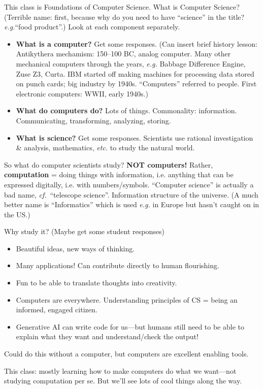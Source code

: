 \documentclass{article}
\newcommand{\etc}{\emph{etc.}\xspace}
\newcommand{\eg}{\emph{e.g.}\xspace}
\begin{document}
This class is Foundations of Computer Science.  What is Computer
Science?  (Terrible name: first, because why do you need to have
``science'' in the title?  \eg ``food product''.)  Look at each
component separately.
\begin{itemize}
\item \textbf{What is a computer?}  Get some responses.  (Can insert
  brief history lesson: Antikythera mechamism: 150--100 BC, analog
  computer.  Many other mechanical computers through the years,
  \eg Babbage Difference Engine, Zuse Z3, Curta.  IBM started off
  making machines for processing data stored on punch cards; big
  industry by 1940s. ``Computers'' referred to people.  First
  electronic computers: WWII, early 1940s.)
\item \textbf{What do computers do?}  Lots of things.  Commonality:
  information.  Communicating, transforming, analyzing, storing.
\item \textbf{What is science?}  Get some responses.  Scientists use
  rational investigation \& analysis, mathematics, \etc to study the
  natural world.
\end{itemize}

So what do computer scientists study?  \textbf{NOT computers!}
Rather, \textbf{computation} = doing things with information,
i.e. anything that can be expressed digitally, i.e. with
numbers/symbols.  ``Computer science'' is actually a bad name,
\emph{cf.}\ ``telescope science''.  Information structure of the
universe. (A much better name is ``Informatics'' which is used \eg in
Europe but hasn't caught on in the US.)

Why study it?  (Maybe get some student responses)
\begin{itemize}
\item Beautiful ideas, new ways of thinking.
\item Many applications!  Can contribute directly to human
  flourishing.
\item Fun to be able to translate thoughts into creativity.
\item Computers are everywhere.  Understanding principles of CS =
  being an informed, engaged citizen.
\item Generative AI can write code for us---but humans still need to
  be able to explain what they want and understand/check the output!
\end{itemize}
Could do this without a computer, but computers are excellent enabling
tools.

This class: mostly learning how to make computers do what we
want---not studying computation per se.  But we'll see lots of cool
things along the way.
\end{document}

